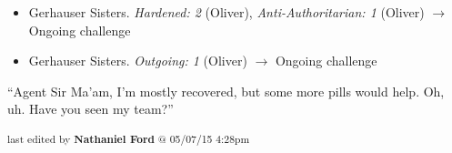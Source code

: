 


\begin{itemize}
\item Gerhauser Sisters. \textit{Hardened: 2} (Oliver), \textit{Anti-Authoritarian: 1} (Oliver) $\rightarrow$ Ongoing challenge
\item Gerhauser Sisters. \textit{Outgoing: 1} (Oliver) $\rightarrow$ Ongoing challenge
\end{itemize}






``Agent Sir Ma'am, I'm mostly recovered, but some more pills would help.  Oh, uh. Have you seen my team?''



\vspace{\fill}

\begin{flushright}
\textsubscript{last edited by \textbf{Nathaniel Ford} @ 05/07/15 4:28pm}
\end{flushright}

